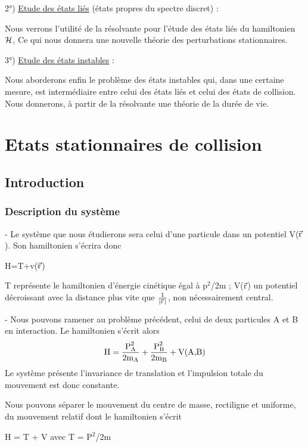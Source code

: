 2°) \ul{Etude des états liés} (états propres du spectre discret) :

Nous verrons l'utilité de la résolvante pour l'étude des états
liés du hamiltonien $\mathcal{H}$, Ce qui nous donnera une nouvelle théorie des perturbations stationnaires.

3°) \ul{Etude des états instables} :

Nous aborderons enfin le problème des états instables qui, dans
une certaine mesure, est intermédiaire entre celui des états liés et celui
des états de collision. Nous donnerons, à partir de la résolvante une théorie de la durée de vie.

\chapter{Etats stationnaires de collision}%
\section{Introduction}%
\subsection{Description du système}%

- Le système que nous étudierons sera celui d'une particule
dans un potentiel V($\vec{\text{r}}$). Son hamiltonien s'écrira donc
\begin{center}
H=T+v($\vec{\text{r}}$)
\end{center}
T représente le hamiltonien d'énergie cinétique égal à p$^2$/2m ;
V($\vec{\text{r}}$) un potentiel décroissant avec la distance plus vite que $\frac{1}{|\vec{\text{r}}\,|}$,
non nécessairement central.

- Nous pouvons ramener au problème précédent, celui de deux
particules A et B en interaction. Le hamiltonien s'écrit alors
\[
\text{H} = \frac{\text{P}_{\text{A}}^2}{2\text{m}_{\text{A}}} + \frac{\text{P}_{\text{B}}^2}{2\text{m}_{\text{B}}} + \text{V(A,B)}
\]
Le système présente l'invariance de translation et l'impulsion totale du
mouvement est donc constante.

Nous pouvons séparer le mouvement du centre de masse, rectiligne et uniforme,
du mouvement relatif dont le hamiltonien s'écrit
\begin{center}
H = T + V \hspace{2cm} avec \hspace{1cm} T = P$^2$/2m
\end{center}

